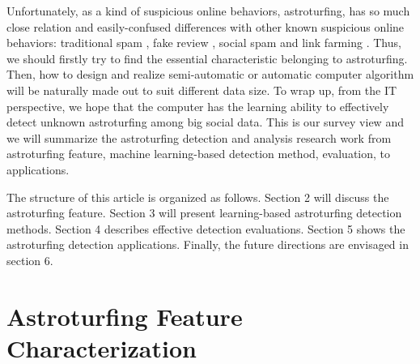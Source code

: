 \documentclass[lettersize,journal]{IEEEtran}
\begin{document}
Unfortunately, as a kind of suspicious online behaviors, astroturfing, has so much close relation and easily-confused differences with other known suspicious online behaviors: traditional spam \cite{Benevenuto2010Detecting}, fake review \cite{Jiang2015A}, social spam \cite{Lee2010Uncovering,Hu2014Social} and link farming \cite{Ghosh2012Understanding}.
Thus, we should firstly try to find the essential characteristic belonging to astroturfing. Then, how to design and realize semi-automatic or automatic computer algorithm will be naturally made out to suit  different data size.
To wrap up, from the IT perspective, we hope that the computer has the learning ability to effectively detect unknown astroturfing among big social data. This is our survey view and we will summarize the astroturfing detection and analysis research work from astroturfing feature, machine learning-based detection method, evaluation, to applications.

The structure of this article is organized as follows. Section 2 will discuss the astroturfing feature. Section 3 will present learning-based astroturfing detection methods. Section 4 describes effective detection evaluations. Section 5 shows the astroturfing detection applications. Finally, the future directions are envisaged in section 6.


\section{Astroturfing Feature Characterization}
\end{document}
